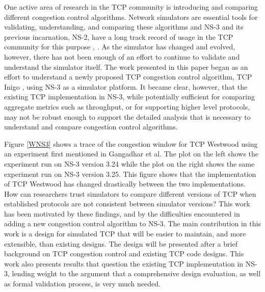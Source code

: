 \documentclass[conference]{IEEEtran}
\begin{document}
One active area of research in the TCP community is introducing and comparing different congestion control algorithms. Network simulators are essential tools for validating, understanding, and comparing these algorithms and NS-3 and its previous incarnation, NS-2, have a long track record of usage in the TCP community for this purpose \cite{NS2Val}, \cite{NS2WP}. As the simulator has changed and evolved, however, there has not been enough of an effort to continue to validate and understand the simulator itself. The work presented in this paper began as an effort to understand a newly proposed TCP congestion control algorithm, TCP Inigo \cite{Inigo}, using NS-3 as a simulator platform. It became clear, however, that the existing TCP implementation in NS-3, while potentially sufficient for comparing aggregate metrics such as throughput, or for supporting higher level protocols, may not be robust enough to support the detailed analysis that is necessary to understand and compare congestion control algorithms.

Figure \ref{WNS3} shows a trace of the congestion window for TCP Westwood using an experiment first mentioned in Gangadhar et al\cite{NS3W}. The plot on the left shows the experiment run on NS-3 version 3.24 while the plot on the right shows the same experiment run on NS-3 version 3.25.  This figure shows that the implementation of TCP Westwood has changed drastically between the two implementations. How can researchers trust simulators to compare different versions of TCP when established protocols are not consistent between simulator versions? This work has been motivated by these findings, and by the difficulties encountered in adding a new congestion control algorithm to NS-3. The main contribution in this work is a design for simulated TCP that will be easier to maintain, and more extensible, than existing designs. The design will be presented after a brief background on TCP congestion control and existing TCP code designs. This work also presents results that question the existing TCP implementation in NS-3, lending weight to the argument that a comprehensive design evaluation, as well as formal validation process, is very much needed. 
\end{document}
